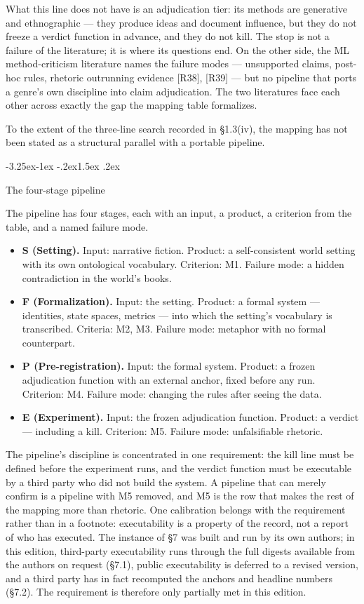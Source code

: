 \documentclass[11pt,a4paper]{article}
\makeatletter
\renewcommand\subsection{\@startsection{subsection}{2}{\z@}%
  {-3.25ex\@plus -1ex \@minus -.2ex}{1.5ex \@plus .2ex}%
  {\normalfont\large\bfseries\raggedright}}
\makeatother
\begin{document}
What this line does not have is an adjudication tier: its methods are generative and ethnographic — they produce ideas and document influence, but they do not freeze a verdict function in advance, and they do not kill. The stop is not a failure of the literature; it is where its questions end. On the other side, the ML method-criticism literature names the failure modes — unsupported claims, post-hoc rules, rhetoric outrunning evidence [R38], [R39] — but no pipeline that ports a genre's own discipline into claim adjudication. The two literatures face each other across exactly the gap the mapping table formalizes.

To the extent of the three-line search recorded in §1.3(iv), the mapping has not been stated as a structural parallel with a portable pipeline.

\subsection{The four-stage pipeline}

The pipeline has four stages, each with an input, a product, a criterion from the table, and a named failure mode.

\begin{itemize}[leftmargin=1.6em,itemsep=2pt,parsep=0pt,topsep=3pt]
\item \textbf{S (Setting).} Input: narrative fiction. Product: a self-consistent world setting with its own ontological vocabulary. Criterion: M1. Failure mode: a hidden contradiction in the world's books.
\item \textbf{F (Formalization).} Input: the setting. Product: a formal system — identities, state spaces, metrics — into which the setting's vocabulary is transcribed. Criteria: M2, M3. Failure mode: metaphor with no formal counterpart.
\item \textbf{P (Pre-registration).} Input: the formal system. Product: a frozen adjudication function with an external anchor, fixed before any run. Criterion: M4. Failure mode: changing the rules after seeing the data.
\item \textbf{E (Experiment).} Input: the frozen adjudication function. Product: a verdict — including a kill. Criterion: M5. Failure mode: unfalsifiable rhetoric.
\end{itemize}

The pipeline's discipline is concentrated in one requirement: the kill line must be defined before the experiment runs, and the verdict function must be executable by a third party who did not build the system. A pipeline that can merely confirm is a pipeline with M5 removed, and M5 is the row that makes the rest of the mapping more than rhetoric. One calibration belongs with the requirement rather than in a footnote: executability is a property of the record, not a report of who has executed. The instance of §7 was built and run by its own authors; in this edition, third-party executability runs through the full digests available from the authors on request (§7.1), public executability is deferred to a revised version, and a third party has in fact recomputed the anchors and headline numbers (§7.2). The requirement is therefore only partially met in this edition.
\end{document}
